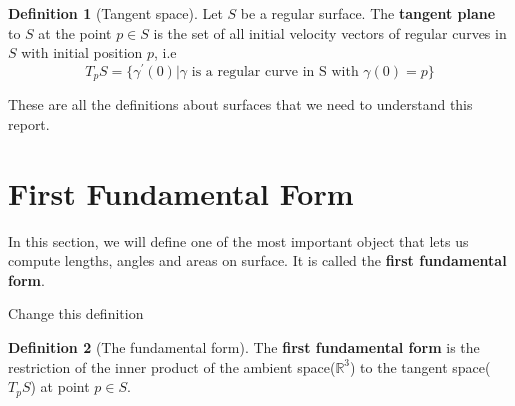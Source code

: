 \documentclass{article}
\theoremstyle{plain}
\theoremstyle{definition}
\newtheorem{definition}{Definition}
\theoremstyle{remark}
\newcommand{\R}{\mathbb{R}}
\begin{document}
\begin{definition}[Tangent space]
    Let \(S\) be a regular surface. The \textbf{tangent plane} to \(S\) at the point \( p \in S\) is the set of all initial velocity vectors of regular curves in \(S\) with initial position \(p\), i.e \[ T_pS = \{ \gamma^\prime(0) | \gamma \text{ is a regular curve in S with }\gamma(0) = p\} \]
\end{definition}

These are all the definitions about surfaces that we need to understand this report.

\section{First Fundamental Form}
In this section, we will define one of the most important object that lets us compute lengths, angles and areas on surface. It is called the \textbf{first fundamental form}.

{\color{red} Change this definition}

\begin{definition}[The fundamental form]
    The \textbf{first fundamental form} is the restriction of the inner product of the ambient space(\(\R^3\)) to the tangent space(\( T_pS\)) at point \( p \in S\).
\end{definition}
\end{document}
